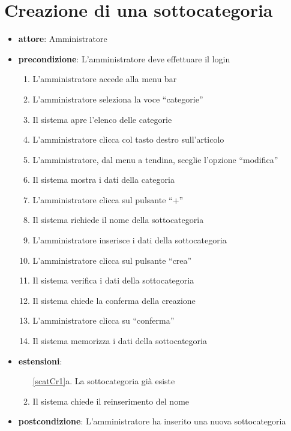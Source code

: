 \section{Creazione di una sottocategoria}
\begin{itemize}
	\item \textbf{attore}: Amministratore
	\item \textbf{precondizione}: L’amministratore deve effettuare il login

	\begin{enumerate}
		\item L’amministratore accede alla menu bar
		\item L’amministratore seleziona la voce “categorie”
		\item Il sistema apre l’elenco delle categorie
		\item L’amministratore clicca col tasto destro sull’articolo
		\item L’amministratore, dal menu a tendina, sceglie l’opzione “modifica”
		\item Il sistema mostra i dati della categoria
		\item L’amministratore clicca sul pulsante “+”
		\label{scatCr1}
		\item Il sistema richiede il nome della sottocategoria
		\item L’amministratore inserisce i dati della sottocategoria
		\item L’amministratore clicca sul pulsante “crea”
		\item Il sistema verifica i dati della sottocategoria
		\item Il sistema chiede la conferma della creazione
		\item L’amministratore clicca su “conferma”
		\item Il sistema memorizza i dati della sottocategoria
	\end{enumerate}

	\item \textbf{estensioni}:
	\begin{enumerate}
		\item[\ref{scatCr1}a.] La sottocategoria già esiste
		\item Il sistema chiede il reinserimento del nome
	\end{enumerate}

	\item \textbf{postcondizione}: L’amministratore ha inserito una nuova sottocategoria	
\end{itemize}


